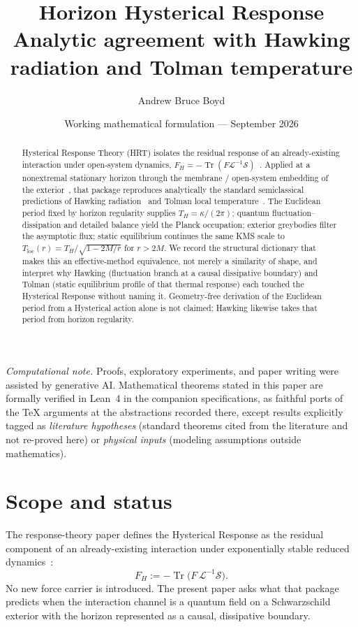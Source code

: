 \documentclass[11pt]{article}
\title{\textbf{Horizon Hysterical Response}\\[0.35em]
\large Analytic agreement with Hawking radiation and Tolman temperature}
\author{Andrew Bruce Boyd}
\date{Working mathematical formulation --- September 2026}
\theoremstyle{definition}
\theoremstyle{remark}
\newcommand{\FH}{F_H}
\newcommand{\Tr}{\operatorname{Tr}}
\begin{document}
\maketitle
\noindent\textit{Computational note.}
Proofs, exploratory experiments, and paper writing were assisted by generative AI.
Mathematical theorems stated in this paper are formally verified in Lean~4 in the
companion specifications, as faithful ports of the TeX arguments at the abstractions
recorded there, except results explicitly tagged as \emph{literature hypotheses}
(standard theorems cited from the literature and not re-proved here) or
\emph{physical inputs} (modeling assumptions outside mathematics).

\begin{abstract}
Hysterical Response Theory (HRT) isolates the residual response of an already-existing
interaction under open-system dynamics,
$\FH=-\Tr(F\mathcal L^{-1}\mathcal S)$~\cite{boyd2026response}.
Applied at a nonextremal stationary horizon through the membrane / open-system
embedding of the exterior~\cite{Thorne1986,Parikh1999,HuRavalSinha2002}, that package
reproduces analytically the standard semiclassical predictions of Hawking
radiation~\cite{Hawking1975} and Tolman local temperature~\cite{Tolman1930,TolmanEhrenfest1930}.
The Euclidean period fixed by horizon regularity supplies
$T_H=\kappa/(2\pi)$; quantum fluctuation--dissipation and detailed balance yield the
Planck occupation; exterior greybodies filter the asymptotic flux; static equilibrium
continues the same KMS scale to
$T_{\mathrm{loc}}(r)=T_H/\sqrt{1-2M/r}$ for $r>2M$.
We record the structural dictionary that makes this an effective-method equivalence, not
merely a similarity of shape, and interpret why Hawking (fluctuation branch at a causal
dissipative boundary) and Tolman (static equilibrium profile of that thermal response)
each touched the Hysterical Response without naming it.
Geometry-free derivation of the Euclidean period from a Hysterical action alone is not
claimed; Hawking likewise takes that period from horizon regularity.
\end{abstract}
\tableofcontents
\newpage

\section{Scope and status}
\label{sec:scope}
The response-theory paper defines the Hysterical Response as the residual component of
an already-existing interaction under exponentially stable reduced
dynamics~\cite{boyd2026response}:
\begin{equation}
\label{eq:FH}
\boxed{\FH:=-\Tr\!\bigl(F\,\mathcal L^{-1}\mathcal S\bigr).}
\end{equation}
No new force carrier is introduced.
The present paper asks what that package predicts when the interaction channel is a
quantum field on a Schwarzschild exterior with the horizon represented as a causal,
dissipative boundary.
\end{document}
